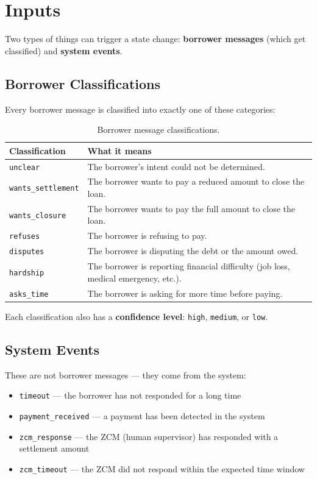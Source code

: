 \documentclass[11pt, a4paper]{article}
\begin{document}
\section{Inputs}
\label{sec:inputs}

Two types of things can trigger a state change: \textbf{borrower messages} (which get classified) and \textbf{system events}.

\subsection{Borrower Classifications}

Every borrower message is classified into exactly one of these categories:

\begin{table}[h]
\centering
\begin{tabular}{lp{9cm}}
\toprule
\textbf{Classification} & \textbf{What it means} \\
\midrule
\texttt{unclear} & The borrower's intent could not be determined. \\
\texttt{wants\_settlement} & The borrower wants to pay a reduced amount to close the loan. \\
\texttt{wants\_closure} & The borrower wants to pay the full amount to close the loan. \\
\texttt{refuses} & The borrower is refusing to pay. \\
\texttt{disputes} & The borrower is disputing the debt or the amount owed. \\
\texttt{hardship} & The borrower is reporting financial difficulty (job loss, medical emergency, etc.). \\
\texttt{asks\_time} & The borrower is asking for more time before paying. \\
\bottomrule
\end{tabular}
\caption{Borrower message classifications.}
\end{table}

Each classification also has a \textbf{confidence level}: \texttt{high}, \texttt{medium}, or \texttt{low}.

\subsection{System Events}

These are not borrower messages --- they come from the system:

\begin{itemize}[nosep]
  \item \texttt{timeout} --- the borrower has not responded for a long time
  \item \texttt{payment\_received} --- a payment has been detected in the system
  \item \texttt{zcm\_response} --- the ZCM (human supervisor) has responded with a settlement amount
  \item \texttt{zcm\_timeout} --- the ZCM did not respond within the expected time window
\end{itemize}
\end{document}
